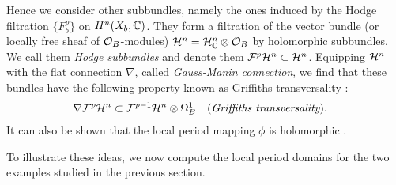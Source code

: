 \documentclass[../main.tex]{subfiles}
\begin{document}
Hence we consider other subbundles, namely the ones induced by the Hodge filtration $\{F^p_b\}$ on $H^n(X_b,\mathbb{C})$. They form a filtration of the vector bundle (or locally free sheaf of $\mathcal{O}_B$-modules) $\mathcal{H}^n = \mathcal{H}^n_{\mathbb{C}} \otimes \mathcal{O}_B$ by holomorphic subbundles. We call them \emph{Hodge subbundles} and denote them $\mathcal{F}^p\mathcal{H}^n \subset \mathcal{H}^n$.
Equipping $\mathcal{H}^n$ with the flat connection $\nabla$, called \emph{Gauss-Manin connection}, we find that these bundles have the following property known as Griffiths transversality \cite[Sect. 4.4]{CMSP03}:
\begin{align*}
\nabla \mathcal{F}^p\mathcal{H}^n &\subset \mathcal{F}^{p-1}\mathcal{H}^n \otimes \Omega^1_B && \mathrm{(\emph{Griffiths transversality})}.
\end{align*}
It can also be shown that the local period mapping $\phi$ is holomorphic \cite[Thm. 4.5.6]{CMSP03}.

To illustrate these ideas, we now compute the local period domains for the two examples studied in the previous section.
\end{document}
